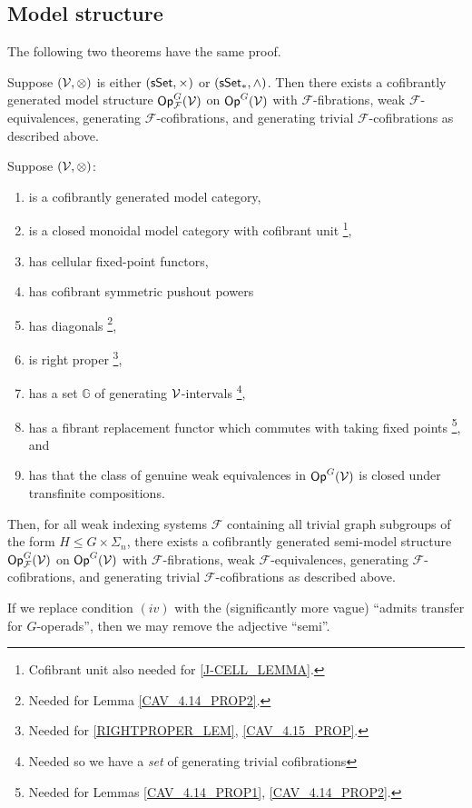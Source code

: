 \documentclass[a4paper,10pt
,draft
]{article}%
\renewcommand{\F}{\mathcal F}
\renewcommand{\1}{\ensuremath{\mathbb{id}}}
\begin{document}
\subsection{Model structure}

The following two theorems have the same proof.

\begin{theorem}
      \label{SSET_MODEL_THM}
      Suppose $(\mathcal V, \otimes)$ is either $(\mathsf{sSet}, \times)$ or $(\sSet_{\**}, \wedge)$.
      Then there exists a cofibrantly generated model structure
      $\mathsf{Op}^G_\F(\V)$ on $\mathsf{Op}^G(\mathcal V)$ with
      $\F$-fibrations, weak $\F$-equivalences, generating $\F$-cofibrations, and generating trivial $\F$-cofibrations as described above.
\end{theorem}

\begin{theorem}
      \label{MODEL_THM}
      Suppose $(\mathcal V, \otimes)$:
      \begin{enumerate}[label = (\roman*)]\itemsep-4pt
      \item is a cofibrantly generated model category,
      \item is a closed monoidal model category with cofibrant unit
            \footnote{Cofibrant unit also needed for \ref{J-CELL_LEMMA}.},
      \item has cellular fixed-point functors,
      \item has cofibrant symmetric pushout powers
      \item has diagonals
            \footnote{Needed for Lemma \ref{CAV_4.14_PROP2}.},
      \item is right proper
            \footnote{Needed for \ref{RIGHTPROPER_LEM}, \ref{CAV_4.15_PROP}.},
      \item has a set $\mathbb{G}$ of generating $\mathcal V$-intervals
            \footnote{Needed so we have a \textit{set} of generating trivial cofibrations},
      \item has a fibrant replacement functor which commutes with taking fixed points
            \footnote{Needed for Lemmas \ref{CAV_4.14_PROP1}, \ref{CAV_4.14_PROP2}.}, and
      \item has that the class of genuine weak equivalences in $\mathsf{Op}^G(\mathcal V)$ is closed under transfinite compositions.
      \end{enumerate}
      Then, for all weak indexing systems $\F$ containing all trivial graph subgroups of the form
      $H \leq G \times \Sigma_n$,
      there exists a cofibrantly generated semi-model structure $\Op^G_\F(\V)$ on $\mathsf{Op}^G(\mathcal V)$ with
      $\F$-fibrations, weak $\F$-equivalences, generating $\F$-cofibrations, and generating trivial $\F$-cofibrations as described above.

      If we replace condition $(iv)$ with the (significantly more vague) ``admits transfer for $G$-operads'',
      then we may remove the adjective ``semi''.
\end{theorem}
\end{document}
